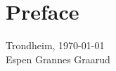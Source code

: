 \chapter*{Preface}


\begin{center}
\vspace{4cm}
\noindent Trondheim, \today
\vspace{2cm}
\\Espen Grannes Graarud
\end{center}
